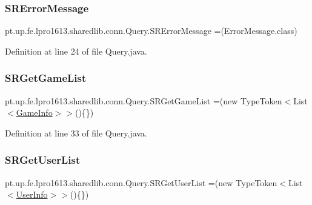 \subsubsection{\texorpdfstring{S\+R\+Error\+Message}{SRErrorMessage}}
{\footnotesize\ttfamily pt.\+up.\+fe.\+lpro1613.\+sharedlib.\+conn.\+Query.\+S\+R\+Error\+Message =(Error\+Message.\+class)}



Definition at line 24 of file Query.\+java.

\hypertarget{enumpt_1_1up_1_1fe_1_1lpro1613_1_1sharedlib_1_1conn_1_1_query_aecfe06afd2edfe3f3175db6b0164bdab}{}\label{enumpt_1_1up_1_1fe_1_1lpro1613_1_1sharedlib_1_1conn_1_1_query_aecfe06afd2edfe3f3175db6b0164bdab} 
\subsubsection{\texorpdfstring{S\+R\+Get\+Game\+List}{SRGetGameList}}
{\footnotesize\ttfamily pt.\+up.\+fe.\+lpro1613.\+sharedlib.\+conn.\+Query.\+S\+R\+Get\+Game\+List =(new Type\+Token$<$List$<$\hyperlink{classpt_1_1up_1_1fe_1_1lpro1613_1_1sharedlib_1_1structs_1_1_game_info}{Game\+Info}$>$$>$()\{\})}



Definition at line 33 of file Query.\+java.

\hypertarget{enumpt_1_1up_1_1fe_1_1lpro1613_1_1sharedlib_1_1conn_1_1_query_ad743a85e754f5d1d070fe30d8cf1ae25}{}\label{enumpt_1_1up_1_1fe_1_1lpro1613_1_1sharedlib_1_1conn_1_1_query_ad743a85e754f5d1d070fe30d8cf1ae25} 
\subsubsection{\texorpdfstring{S\+R\+Get\+User\+List}{SRGetUserList}}
{\footnotesize\ttfamily pt.\+up.\+fe.\+lpro1613.\+sharedlib.\+conn.\+Query.\+S\+R\+Get\+User\+List =(new Type\+Token$<$List$<$\hyperlink{classpt_1_1up_1_1fe_1_1lpro1613_1_1sharedlib_1_1structs_1_1_user_info}{User\+Info}$>$$>$()\{\})}



